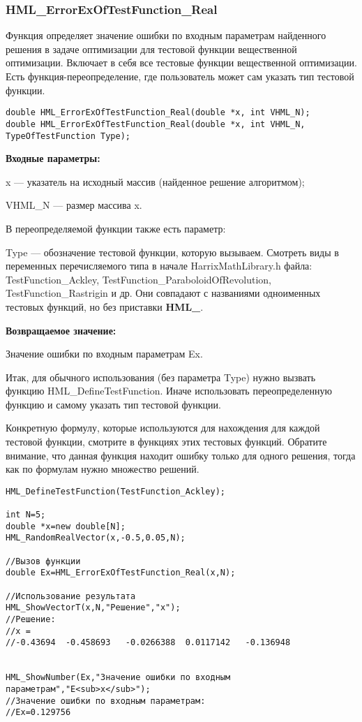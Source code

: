 \documentclass[a4paper,12pt]{article}
\begin{document}
\subsubsection{HML\_ErrorExOfTestFunction\_Real}\label{HML_ErrorExOfTestFunction_Real}

Функция определяет значение ошибки по входным параметрам найденного решения в задаче оптимизации для тестовой функции вещественной оптимизации. Включает в себя все тестовые функции вещественной оптимизации. Есть функция-переопределение, где пользователь может сам указать тип тестовой функции.


\begin{lstlisting}[label=code_syntax_HML_ErrorExOfTestFunction_Real,caption=Синтаксис]
double HML_ErrorExOfTestFunction_Real(double *x, int VHML_N);
double HML_ErrorExOfTestFunction_Real(double *x, int VHML_N, TypeOfTestFunction Type);
\end{lstlisting}

\textbf{Входные параметры:}

x --- указатель на исходный массив (найденное решение алгоритмом);

VHML\_N --- размер массива x.

В переопределяемой функции также есть параметр:
  
Type --- обозначение тестовой функции, которую вызываем.
Смотреть виды в переменных перечисляемого типа в начале HarrixMathLibrary.h файла: TestFunction\_Ackley, TestFunction\_ParaboloidOfRevolution, TestFunction\_Rastrigin и др. Они совпадают с названиями одноименных тестовых функций, но без приставки \textbf{HML\_}.

\textbf{Возвращаемое значение:}
 
Значение ошибки по входным параметрам Ex.

Итак, для обычного использования (без параметра Type) нужно вызвать функцию HML\_DefineTestFunction. Иначе использовать переопределенную функцию и самому указать тип тестовой функции.

Конкретную формулу, которые используются для нахождения для каждой тестовой функции, смотрите в функциях этих тестовых функций. Обратите внимание, что данная функция находит ошибку только для одного решения, тогда как по формулам нужно множество решений.


\begin{lstlisting}[label=code_use_HML_ErrorExOfTestFunction_Real,caption=Пример использования]
HML_DefineTestFunction(TestFunction_Ackley);

int N=5;
double *x=new double[N];
HML_RandomRealVector(x,-0.5,0.05,N);

//Вызов функции
double Ex=HML_ErrorExOfTestFunction_Real(x,N);

//Использование результата
HML_ShowVectorT(x,N,"Решение","x");
//Решение:
//x =
//-0.43694	-0.458693	-0.0266388	0.0117142	-0.136948


HML_ShowNumber(Ex,"Значение ошибки по входным параметрам","E<sub>x</sub>");
//Значение ошибки по входным параметрам:
//Ex=0.129756
\end{lstlisting}
\end{document}
